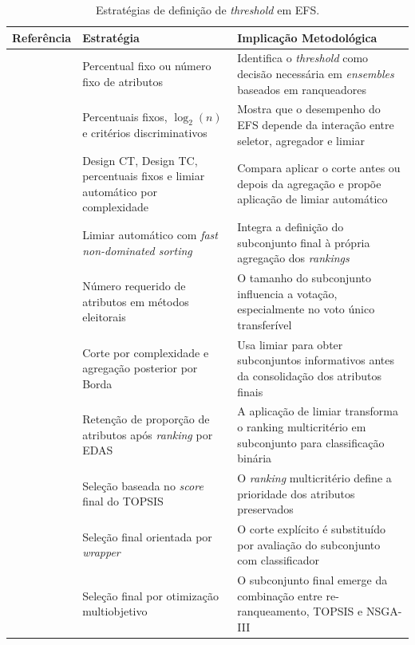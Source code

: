 \begin{table}[H]
\centering
\small
\caption{Estratégias de definição de \textit{threshold} em EFS.}\label{tab:efs_thresholds}
\begin{tabular}{P{3.0cm}P{4.2cm}P{6.0cm}}
\toprule
\textbf{Referência} & \textbf{Estratégia} & \textbf{Implicação Metodológica} \\
\midrule

 &
Percentual fixo ou número fixo de atributos &
Identifica o \textit{threshold} como decisão necessária em \textit{ensembles} baseados em ranqueadores \\ \hline

 &
Percentuais fixos, $\log_2(n)$ e critérios discriminativos &
Mostra que o desempenho do EFS depende da interação entre seletor, agregador e limiar \\ \hline

 &
Design CT, Design TC, percentuais fixos e limiar automático por complexidade &
Compara aplicar o corte antes ou depois da agregação e propõe aplicação de limiar automático \\ \hline

 &
Limiar automático com \textit{fast non-dominated sorting} &
Integra a definição do subconjunto final à própria agregação dos \textit{rankings} \\ \hline

 &
Número requerido de atributos em métodos eleitorais &
O tamanho do subconjunto influencia a votação, especialmente no voto único transferível \\ \hline

 &
Corte por complexidade e agregação posterior por Borda &
Usa limiar para obter subconjuntos informativos antes da consolidação dos atributos finais \\ \hline

 &
Retenção de proporção de atributos após \textit{ranking} por EDAS &
A aplicação de limiar transforma o ranking multicritério em subconjunto para classificação binária \\ \hline

 &
Seleção baseada no \textit{score} final do TOPSIS &
O \textit{ranking} multicritério define a prioridade dos atributos preservados \\ \hline

 &
Seleção final orientada por \textit{wrapper} &
O corte explícito é substituído por avaliação do subconjunto com classificador \\ \hline

 &
Seleção final por otimização multiobjetivo &
O subconjunto final emerge da combinação entre re-ranqueamento, TOPSIS e NSGA-III \\

\bottomrule
\end{tabular}
\end{table}
